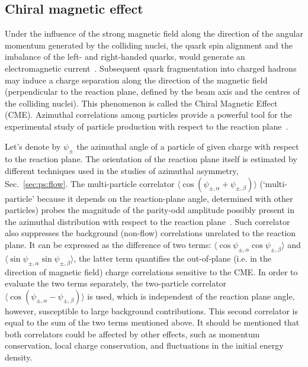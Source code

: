 \subsection{Chiral magnetic effect}
\label{subsecks:chiral}
Under the influence of the strong magnetic field along the direction of the angular momentum generated by the colliding nuclei, the quark spin alignment and the imbalance of the left- and right-handed quarks, would generate an electromagnetic current~\cite{Kharzeev:2004ey,Fukushima:2008xe,Kharzeev:2007jp}. Subsequent quark fragmentation into charged hadrons may induce a charge separation along the direction of the magnetic field (perpendicular to the reaction plane, defined by the beam axis and the centres of the colliding nuclei). This phenomenon is called the Chiral Magnetic Effect (CME). Azimuthal correlations among particles provide a powerful tool for the experimental study of particle production with respect to the reaction plane~\cite{Abelev:2012pa}.

Let's denote by $\psi_\pm$ the azimuthal angle of a particle of given charge with respect to the reaction plane. The orientation of the reaction plane itself is estimated by different techniques used in the studies of azimuthal asymmetry, Sec.~\ref{sec:ps:flow}. The multi-particle correlator $\langle \cos{(\psi_{\pm,\alpha} + \psi_{\pm,\beta})} \rangle$ (`multi-particle' because it depends on the reaction-plane angle, determined with other particles) probes the magnitude of the parity-odd amplitude possibly present in the azimuthal distribution with respect to the reaction plane~\cite{Voloshin:2004vk}. Such correlator also suppresses the background (non-flow) correlations unrelated to the reaction plane. It can be expressed as the difference of two terms: $\langle \cos{\psi_{\pm,\alpha}} \cos{\psi_{\pm,\beta}} \rangle$ and $\langle \sin{\psi_{\pm,\alpha}} \sin{\psi_{\pm,\beta}} \rangle$, the latter term quantifies the out-of-plane (i.e. in the direction of magnetic field) charge correlations sensitive to the CME. In order to evaluate the two terms separately, the two-particle correlator $\langle \cos{(\psi_{\pm,\alpha} - \psi_{\pm,\beta})} \rangle$ is used, which is independent of the reaction plane angle, however, susceptible to large background contributions. This second correlator is equal to the sum of the two terms mentioned above. It should be mentioned that both correlators could be affected by other effects, such as momentum conservation, local charge conservation, and fluctuations in the initial energy density.

